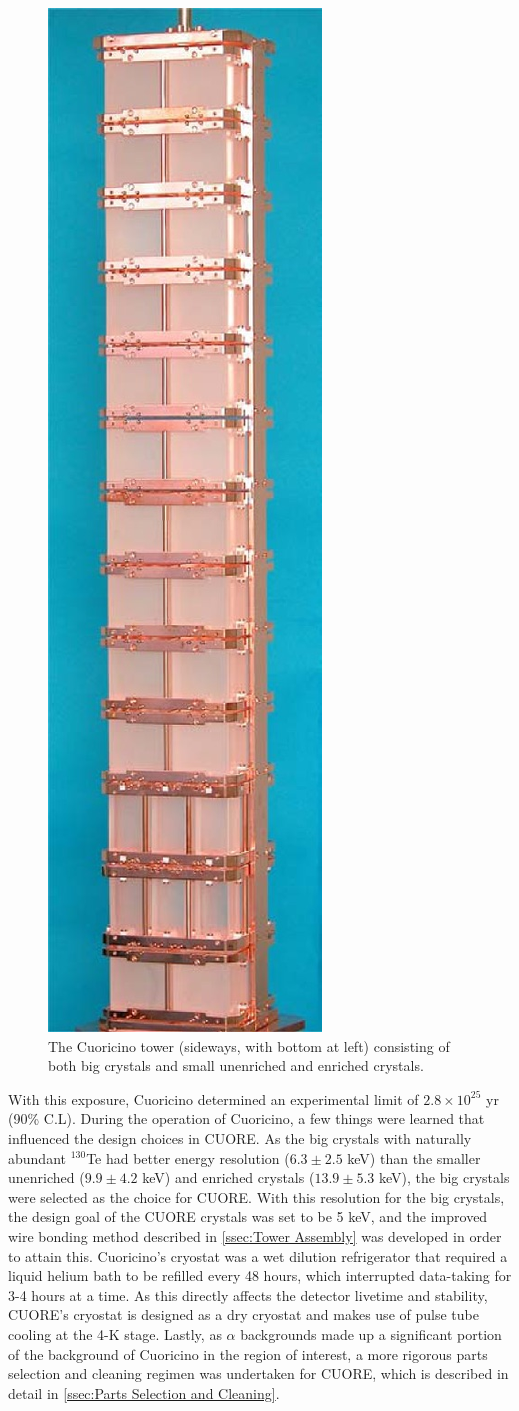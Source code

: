 \begin{figure}[htbp]
    \centering
    \includegraphics[width=0.8\linewidth, height=0.8\linewidth, keepaspectratio, angle=270, origin = c]{Figures/CUORICINO.jpg}
    \vspace*{-1.5 in}
    \caption[The Cuoricino tower consisting of both big crystals and small unenriched and enriched crystals]
    {The Cuoricino tower (sideways, with bottom at left) consisting of both big crystals and small unenriched and enriched crystals.}
    \label{fig:Cuoricino_tower}
\end{figure}

With this exposure, Cuoricino determined an experimental limit of $2.8\times10^{25}$ yr (90\% C.L).
During the operation of Cuoricino, a few things were learned that influenced the design choices in CUORE.
As the big crystals with naturally abundant $^{130}$Te had better energy resolution ($6.3 \pm2.5$ keV) than the smaller unenriched ($9.9\pm4.2$ keV) and enriched crystals ($13.9\pm5.3$ keV), the big crystals were selected as the choice for CUORE.
With this resolution for the big crystals, the design goal of the CUORE crystals was set to be 5 keV, and the improved wire bonding method described in \autoref{ssec:Tower Assembly} was developed in order to attain this.
Cuoricino's cryostat was a wet dilution refrigerator that required a liquid helium bath to be refilled every 48 hours, which interrupted data-taking for 3-4 hours at a time.
As this directly affects the detector livetime and stability, CUORE's cryostat is designed as a dry cryostat and makes use of pulse tube cooling at the 4-K stage.
Lastly, as $\alpha$ backgrounds made up a significant portion of the background of Cuoricino in the region of interest, a more rigorous parts selection and cleaning regimen was undertaken for CUORE, which is described in detail in \autoref{ssec:Parts Selection and Cleaning}.

